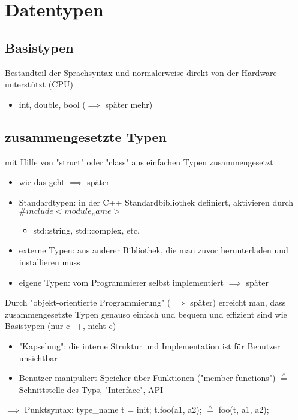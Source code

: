 \documentclass[a4paper]{scrartcl}
\newcommand{\estimates}{\overset{\scriptscriptstyle\wedge}{=}}%
\theoremstyle{definition}
\theoremstyle{plain}
\theoremstyle{remark}
\theoremstyle{remark}
\begin{document}
\section{Datentypen}
\label{sec-8}
\subsection{Basistypen}
\label{sec-8-1}
Bestandteil der Sprachsyntax und normalerweise direkt von der Hardware unterstützt (CPU)
\begin{itemize}
\item int, double, bool ($\implies$ später mehr)
\end{itemize}
\subsection{zusammengesetzte Typen}
\label{sec-8-2}
mit Hilfe von "struct" oder "class" aus einfachen Typen zusammengesetzt
\begin{itemize}
\item wie das geht $\implies$ später
\item Standardtypen: in der C++ Standardbibliothek definiert, aktivieren durch $\#include <module_name>$
\begin{itemize}
\item std::string, std::complex, etc.
\end{itemize}
\item externe Typen: aus anderer Bibliothek, die man zuvor herunterladen und installieren muss
\item eigene Typen: vom Programmierer selbst implementiert $\implies$ später
\end{itemize}
Durch "objekt-orientierte Programmierung" ($\implies$ später) erreicht man, dass zusammengesetzte
 Typen genauso einfach und bequem und effizient sind wie Basistypen (nur c++, nicht c)
\begin{itemize}
\item "Kapselung": die interne Struktur und Implementation ist für Benutzer unsichtbar
\item Benutzer manipuliert Speicher über Funktionen ("member functions") $\estimates$ Schnittstelle des Typs, "Interface", API
\end{itemize}

$\implies$ Punktsyntax: type\_name t = init; t.foo(a1, a2); $\estimates$ foo(t, a1, a2);
\end{document}
